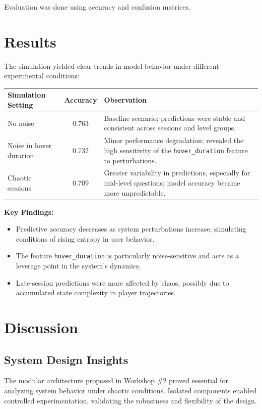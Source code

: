 \documentclass[12pt]{article}
\begin{document}
	\noindent Evaluation was done using accuracy and confusion matrices.
	
\section{Results}

The simulation yielded clear trends in model behavior under different experimental conditions:

\begin{longtable}{|l|c|p{8cm}|}
	\hline
	\textbf{Simulation Setting} & \textbf{Accuracy} & \textbf{Observation} \\
	\hline
	No noise & 0.763 & Baseline scenario; predictions were stable and consistent across sessions and level groups. \\
	Noise in hover duration & 0.732 & Minor performance degradation; revealed the high sensitivity of the \texttt{hover\_duration} feature to perturbations. \\
	Chaotic sessions & 0.709 & Greater variability in predictions, especially for mid-level questions; model accuracy became more unpredictable. \\
	\hline
\end{longtable}

\noindent \textbf{Key Findings:}
\begin{itemize}
	\item Predictive accuracy decreases as system perturbations increase, simulating conditions of rising entropy in user behavior.
	\item The feature \texttt{hover\_duration} is particularly noise-sensitive and acts as a leverage point in the system's dynamics.
	\item Late-session predictions were more affected by chaos, possibly due to accumulated state complexity in player trajectories.
\end{itemize}
	
\section{Discussion}

\subsection{System Design Insights}

The modular architecture proposed in Workshop \#2 proved essential for analyzing system behavior under chaotic conditions. Isolated components enabled controlled experimentation, validating the robustness and flexibility of the design.
\end{document}

